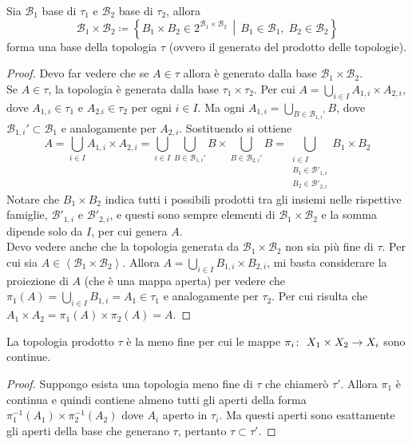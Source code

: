 \begin{theorem}
	Sia $\mathcal{B}_1$ base di $\tau_1$ e $\mathcal{B_2}$ base di $\tau_2$, allora
	\begin{equation*}
		\mathcal{B}_1 \times \mathcal{B}_2 \coloneqq \left\{B_1 \times B_2 \in 2^{\mathcal{B}_1 \times \mathcal{B}_2} \,\middle|\, B_1 \in \mathcal{B}_1, \; B_2 \in \mathcal{B}_2\right\}
	\end{equation*}
	forma una base della topologia $\tau$ (ovvero il generato del prodotto delle topologie).
\end{theorem}
\begin{proof}
	Devo far vedere che se $A \in \tau$ allora è generato dalla base $\mathcal{B}_1 \times \mathcal{B}_2$. \\ Se $A \in \tau$, la topologia è generata dalla base $\tau_1 \times \tau_2$. Per cui $A = \bigcup_{i \in I} A_{1,i} \times A_{2,i}$, dove $A_{1,i} \in \tau_1$ e $A_{2.i} \in \tau_2$ per ogni $i \in I$. Ma ogni $A_{1, i} = \bigcup_{B \in \mathcal{B}_{1,i}'} B$, dove $\mathcal{B}_{1,i}' \subset \mathcal{B}_1$ e analogamente per $A_{2,i}$. Sostituendo si ottiene
	\begin{equation*}
		A = \bigcup_{i \in I} A_{1,i} \times A_{2,i} = \bigcup_{i \in I} \bigcup_{B \in \mathcal{B}_{1,i}'} B \times \bigcup_{B \in \mathcal{B}_{2,i}'} B = \bigcup_{\substack{i \in I \\ B_1 \in \mathcal{B}'_{1,i} \\ B_2 \in \mathcal{B}'_{2,i}}} B_1 \times B_2
	\end{equation*}
	Notare che $B_1 \times B_2$ indica tutti i possibili prodotti tra gli insiemi nelle rispettive famiglie, $\mathcal{B}'_{1,i}$ e $\mathcal{B}'_{2,i}$, e questi sono sempre elementi di $\mathcal{B}_1 \times \mathcal{B}_2$ e la somma dipende solo da $I$, per cui genera $A$. \\
	
	Devo vedere anche che la topologia generata da $\mathcal{B}_1 \times \mathcal{B}_2$ non sia più fine di $\tau$. Per cui sia $A \in \left\langle \mathcal{B}_1 \times \mathcal{B}_2 \right\rangle$. Allora $A = \bigcup_{i \in I} B_{1,i} \times B_{2,i}$, mi basta considerare la proiezione di $A$ (che è una mappa aperta) per vedere che $\pi_1(A) = \bigcup_{i \in I} B_{1,i} = A_1 \in \tau_1$ e analogamente per $\tau_2$. Per cui risulta che $A_1 \times A_2 = \pi_1(A) \times \pi_2(A) = A$.
\end{proof}


\begin{theorem}
	La topologia prodotto $\tau$ è la meno fine per cui le mappe $\pi_i \colon\ X_1\times X_2 \rightarrow X_i$ sono continue.
\end{theorem}
\begin{proof}
	Suppongo esista una topologia meno fine di $\tau$ che chiamerò $\tau'$. Allora $\pi_1$ è continua e quindi contiene almeno tutti gli aperti della forma $\pi^{-1}_1(A_1) \times \pi^{-1}_2(A_2)$ dove $A_i$ aperto in $\tau_i$. Ma questi aperti sono esattamente gli aperti della base che generano $\tau$, pertanto $\tau \subset \tau'$.
\end{proof}

